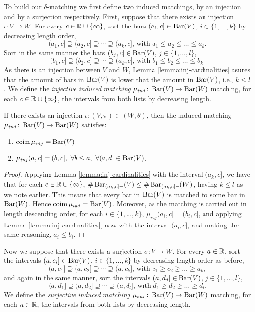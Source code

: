 To build our $\delta$-matching we first define two induced matchings, by an injection and by a surjection respectively. First, suppose that there exists an injection $\iota \colon V \to W$. For every $ c \in \mathbb R \cup \{\infty\}$, sort the bars $(a_i, c] \in \operatorname{Bar}(V) $, $i \in \{1, \dots, k\} $ by decreasing length order,
$$
    (a_1, c] \supseteq (a_2, c] \supseteq \cdots \supseteq (a_k, c] \text{, with } a_1 \leq a_2 \leq \dots \leq a_k.
$$
Sort in the same manner the bars $(b_j, c] \in \operatorname{Bar}(V) $, $j \in \{1, \dots, l\} $,
$$
    (b_1, c] \supseteq (b_2, c] \supseteq \cdots \supseteq (a_k, c] \text{, with } b_1 \leq b_2 \leq \dots \leq b_k.
$$
As there is an injection between $ V $ and $ W$, Lemma \ref{lemma:inj-cardinalities} asures that the amount of bars in $ \operatorname{Bar}(V) $ is lower that the amount in $ \operatorname{Bar}(V) $, i.e., $ k \leq l $. We define the {\it injective induced matching} $\mu_{inj}\colon \operatorname{Bar}(V) \to \operatorname{Bar}(W) $ matching, for each $ c \in \mathbb R \cup \{\infty\} $, the intervals from both lists by decreasing length.

\begin{lemma} \cite[Proposition 3.1.5]{polterovich} \label{lemma:inj-matching}
    If there exists an injection $\iota\colon (V, \pi) \in (W, \theta) $, then the induced matching $ \mu_{inj}\colon \operatorname{Bar}(V) \to \operatorname{Bar} (W) $ satisfies:
    \begin{enumerate}
        \item $\operatorname{coim} \mu_{inj} = \operatorname{Bar}(V)$, \label{prop:3.1.5. 1}
        \item $\mu_{inj}(a, c] = (b, c], \ \forall b \leq a, \ \forall (a, d] \in \operatorname{Bar}(V)$.
    \end{enumerate}
\end{lemma}
\begin{proof}
    Applying Lemma \ref{lemma:inj-cardinalities} with the interval $ (a_k, c] $, we have that for each $ c \in \mathbb R \cup \{\infty\} $, $ \# \operatorname{Bar}_{(a_k, c]-}(V) \leq \# \operatorname{Bar}_{(a_k, c]-}(W) $, having $ k \leq l $ as we note earlier. This means that every bar in $\operatorname{Bar}(V)$ is matched to some bar in $\operatorname{Bar}(W)$. Hence $\operatorname{coim} \mu_{inj} = \operatorname{Bar}(V)$. Moreover, as the matching is carried out in length descending order, for each $ i \in \{1, \dots, k\} $, $\mu_{inj}(a_i, c] = (b_i, c]$, and applying Lemma \ref{lemma:inj-cardinalities}, now with the interval $ (a_i, c] $, and making the same reasoning, $ a_i \leq b_i $.
\end{proof}

Now we suppose that there exists a surjection $ \sigma\colon V \to W $. For every $ a \in \mathbb R$, sort the intervals $(a, c_i] \in \operatorname{Bar}(V) $, $i \in \{1, \dots, k\} $ by decreasing length order as before,
$$
    (a, c_1] \supseteq (a, c_2] \supseteq \cdots \supseteq (a, c_k] \text{, with } c_1 \geq c_2 \geq \dots \geq a_k,
$$
and again in the same manner, sort the intervals $(a, d_j] \in \operatorname{Bar}(V) $, $j \in \{1, \dots, l\} $,
$$
    (a, d_1] \supseteq (a, d_2] \supseteq \cdots \supseteq (a, d_l] \text{, with } d_1 \geq d_2 \geq \dots \geq d_l.
$$
We define the {\it surjective induced matching} $\mu_{sur}\colon \operatorname{Bar}(V) \to \operatorname{Bar}(W) $ matching, for each $ a \in \mathbb R $, the intervals from both lists by decreasing length.

